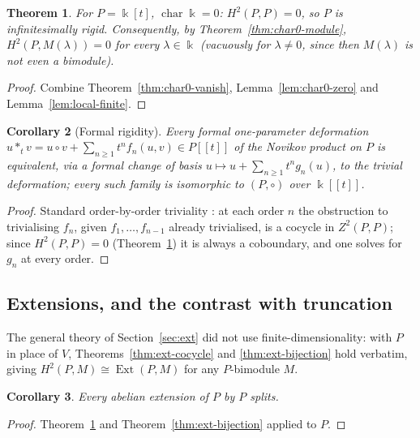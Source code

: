 \documentclass[11pt,reqno]{amsart}
\theoremstyle{plain}
\newtheorem{theorem}{Theorem}[section]
\newtheorem{corollary}[theorem]{Corollary}
\theoremstyle{definition}
\DeclareMathOperator{\Ext}{Ext}
\newcommand{\kk}{\Bbbk}
\newcommand{\Zt}{Z^2}
\newcommand{\Ht}{H^2}
\begin{document}
\begin{theorem}\label{thm:char0-main}
For $P=\kk[t]$, $\operatorname{char}\kk=0$: $\Ht(P,P)=0$, so $P$ is infinitesimally rigid.
Consequently, by Theorem~\ref{thm:char0-module}, $\Ht(P,M(\lambda))=0$ for every
$\lambda\in\kk$ \textup{(}vacuously for $\lambda\ne0$, since then $M(\lambda)$ is not even a
bimodule\textup{)}.
\end{theorem}

\begin{proof}
Combine Theorem~\ref{thm:char0-vanish}, Lemma~\ref{lem:char0-zero} and
Lemma~\ref{lem:local-finite}.
\end{proof}

\begin{corollary}[Formal rigidity]\label{cor:formal-rigid}
Every formal one-parameter deformation $u*_tv=u\circ v+\sum_{n\ge1}t^nf_n(u,v)\in P[[t]]$ of
the Novikov product on $P$ is equivalent, via a formal change of basis
$u\mapsto u+\sum_{n\ge1}t^ng_n(u)$, to the trivial deformation; every such family is
isomorphic to $(P,\circ)$ over $\kk[[t]]$.
\end{corollary}

\begin{proof}
Standard order-by-order triviality \cite{Gerstenhaber}: at each order $n$ the obstruction to
trivialising $f_n$, given $f_1,\dots,f_{n-1}$ already trivialised, is a cocycle in
$\Zt(P,P)$; since $\Ht(P,P)=0$ (Theorem~\ref{thm:char0-main}) it is always a coboundary, and
one solves for $g_n$ at every order.
\end{proof}

\subsection{Extensions, and the contrast with truncation}

The general theory of Section~\ref{sec:ext} did not use finite-dimensionality: with $P$ in
place of $V$, Theorems~\ref{thm:ext-cocycle} and \ref{thm:ext-bijection} hold verbatim,
giving $\Ht(P,M)\cong\Ext(P,M)$ for any $P$-bimodule $M$.

\begin{corollary}\label{cor:char0-ext}
Every abelian extension of $P$ by $P$ splits.
\end{corollary}

\begin{proof}
Theorem~\ref{thm:char0-main} and Theorem~\ref{thm:ext-bijection} applied to $P$.
\end{proof}
\end{document}
